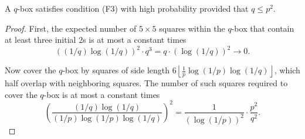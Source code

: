 \documentclass[10pt,a4paper]{amsart}
\newcommand{\floor}[1]{\left\lfloor#1\right \rfloor}
\begin{document}
\begin{lemma}\label{lem:F3}
    A $q$-box satisfies condition (F3) with high probability provided that $q \le p^2$.
\end{lemma}

\begin{proof}
    First, the expected number of $5\times 5$ squares within the $q$-box that contain at least three initial $2$s is at most a constant times 
    \[
    \left((1/q)\log(1/q)\right)^2 \cdot q^3
    = q\cdot (\log(1/q))^2\to 0.
    \]
    

    Now cover the $q$-box by squares of side length $6 \floor{\frac{1}{p}\log(1/p)\log(1/q)}$, which half overlap with neighboring squares. 
    The number of such squares required to cover the $q$-box is at most
    a constant times 
    \begin{equation}\label{eqn:F3-squares}
    \left(\frac{(1/q)\log(1/q)}{(1/p)\log(1/p)\log(1/q)}\right)^2 = \frac{1}{(\log(1/p))^2} \cdot \frac{p^2}{q^2}.
    \end{equation}
    



\end{proof}
\end{document}
